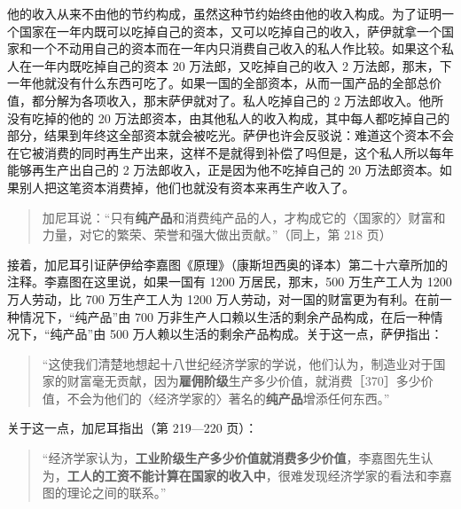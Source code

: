 他的收入从来不由他的节约构成，虽然这种节约始终由他的收入构成。为了证明一个国家在一年内既可以吃掉自己的资本，又可以吃掉自己的收入，萨伊就拿一个国家和一个不动用自己的资本而在一年内只消费自己收入的私人作比较。如果这个私人在一年内既吃掉自己的资本 20 万法郎，又吃掉自己的收入 2 万法郎，那末，下一年他就没有什么东西可吃了。如果一国的全部资本，从而一国产品的全部总价值，都分解为各项收入，那末萨伊就对了。私人吃掉自己的 2 万法郎收入。他所没有吃掉的他的 20 万法郎资本，由其他私人的收入构成，其中每人都吃掉自己的部分，结果到年终这全部资本就会被吃光。萨伊也许会反驳说：难道这个资本不会在它被消费的同时再生产出来，这样不是就得到补偿了吗但是，这个私人所以每年能够再生产出自己的 2 万法郎收入，正是因为他不吃掉自己的 20 万法郎资本。如果别人把这笔资本消费掉，他们也就没有资本来再生产收入了。\fontbox{\}~}

\begin{quote}加尼耳说：“只有\textbf{纯产品}和消费纯产品的人，才构成它的〈国家的〉财富和力量，对它的繁荣、荣誉和强大做出贡献。”（同上，第 218 页）\end{quote}

接着，加尼耳引证萨伊给李嘉图《原理》（康斯坦西奥的译本）第二十六章所加的注释。李嘉图在这里说，如果一国有 1200 万居民，那末，500 万生产工人为 1200 万人劳动，比 700 万生产工人为 1200 万人劳动，对一国的财富更为有利。在前一种情况下，“纯产品”由 700 万非生产人口赖以生活的剩余产品构成，在后一种情况下，“纯产品”由 500 万人赖以生活的剩余产品构成。关于这一点，萨伊指出：

\begin{quote}“这使我们清楚地想起十八世纪经济学家的学说，他们认为，制造业对于国家的财富毫无贡献，因为\textbf{雇佣阶级}生产多少价值，就消费［370］多少价值，不会为他们的〈经济学家的〉著名的\textbf{纯产品}增添任何东西。”\end{quote}

关于这一点，加尼耳指出（第 219—220 页）：

\begin{quote}“经济学家认为，\textbf{工业阶级生产多少价值就消费多少价值}，李嘉图先生认为，\textbf{工人的工资不能计算在国家的收入中}，很难发现经济学家的看法和李嘉图的理论之间的联系。”\end{quote}

